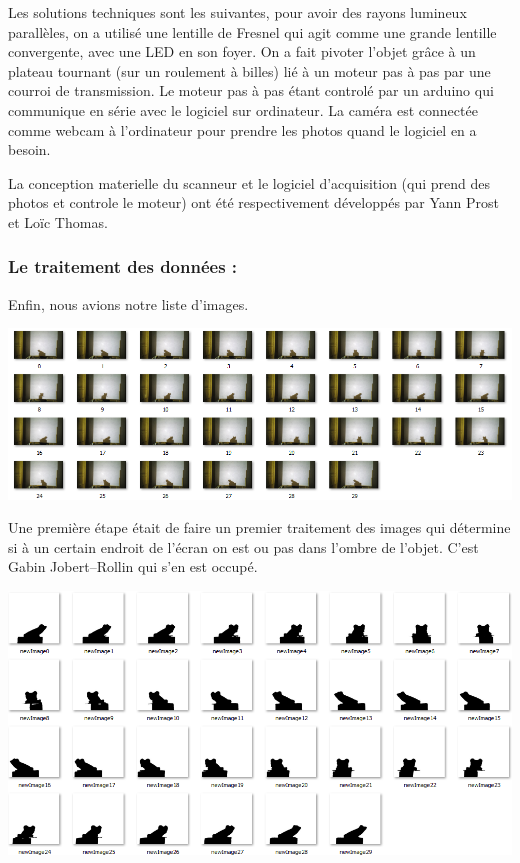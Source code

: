\documentclass{article}
\begin{document}
Les solutions techniques sont les suivantes, pour avoir des rayons
lumineux parallèles, on a utilisé une lentille de Fresnel qui agit
comme une grande lentille convergente, avec une LED en son foyer.
On a fait pivoter l'objet grâce à un plateau tournant (sur un roulement
à billes) lié à un moteur pas à pas par une courroi de transmission.
Le moteur pas à pas étant controlé par un arduino qui communique en
série avec le logiciel sur ordinateur. La caméra est connectée comme
webcam à l'ordinateur pour prendre les photos quand le logiciel en
a besoin.

La conception materielle du scanneur et le logiciel d'acquisition
(qui prend des photos et controle le moteur) ont été respectivement
développés par Yann Prost et Loïc Thomas.

\subsubsection*{Le traitement des données :}

Enfin, nous avions notre liste d'images.

\includegraphics[scale=0.25]{5}

Une première étape était de faire un premier traitement des images
qui détermine si à un certain endroit de l'écran on est ou pas dans
l'ombre de l'objet. C'est Gabin Jobert--Rollin qui s'en est occupé.

\includegraphics[scale=0.25]{6}
\end{document}
